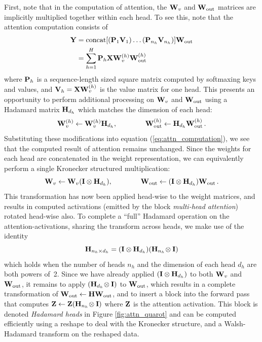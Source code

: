 First, note that in the computation of attention, the ${\mathbf{W}}_v$ and ${\mathbf{W}}_\textrm{out}$ matrices are implicitly multiplied together within each head. To see this, note that the attention computation consists of
\begin{align}
    {\mathbf{Y}} &= \textrm{concat}[({\mathbf{P}}_1{\mathbf{V}}_1)\ldots({\mathbf{P}}_{n_h} {\mathbf{V}}_{n_h})]{\mathbf{W}}_\textrm{out}\\
    &= \sum_{h=1}^H {\mathbf{P}}_h{\mathbf{X}}{\mathbf{W}}_v^{(h)} {\mathbf{W}}_\textrm{out}^{(h)}\label{eq:attn_computation}
\end{align}
where ${\mathbf{P}}_h$ is a sequence-length sized square matrix computed by softmaxing keys and values, and ${\mathbf{V}}_h = {\mathbf{X}}{\mathbf{W}}_v^{(h)}$ is the value matrix for one head.  This presents an opportunity to perform additional processing on ${\mathbf{W}}_v$ and ${\mathbf{W}}_\textrm{out}$ using a Hadamard matrix ${\mathbf{H}}_{d_h}$ which matches the dimension of each head:
\begin{equation}
    {\mathbf{W}}_v^{(h)} \leftarrow {\mathbf{W}}_v^{(h)}{\mathbf{H}}_{d_h},\qquad\qquad {\mathbf{W}}_\textrm{out}^{(h)} \leftarrow {\mathbf{H}}_{d_h}{\mathbf{W}}_\textrm{out}^{(h)}\,.
\end{equation}
Substituting these modifications into equation (\ref{eq:attn_computation}), we see that the computed result of attention remains unchanged. Since the weights for each head are concatenated in the weight representation, we can equivalently perform a single Kronecker structured multiplication:
\begin{equation}
    {\mathbf{W}}_v \leftarrow {\mathbf{W}}_v ( {\mathbf{I}} \otimes {\mathbf{H}}_{d_h}),\qquad \qquad {\mathbf{W}}_\textrm{out} \leftarrow ({\mathbf{I}} \otimes {\mathbf{H}}_{d_h}) {\mathbf{W}}_\textrm{out}\,.
\end{equation}
This transformation has now been applied head-wise to the weight matrices, and results in computed activations (emitted by the block \emph{multi-head attention}) rotated head-wise also. To complete a ``full'' Hadamard operation on the attention-activations, sharing the transform across heads, we make use of the identity
\begin{equation}
    {\mathbf{H}}_{n_h \times d_h} = ({\mathbf{I}} \otimes{\mathbf{H}}_{d_h}) ({\mathbf{H}}_{n_h}\!\otimes {\mathbf{I}})
\end{equation}
which holds when the number of heads $n_h$ and the dimension of each head $d_h$ are both powers of~2. Since we have already applied $({\mathbf{I}} \otimes{\mathbf{H}}_{d_h})$ to both ${\mathbf{W}}_v$ and ${\mathbf{W}}_\textrm{out}$, it remains to apply $({\mathbf{H}}_{d_h}\!\otimes {\mathbf{I}})$ to ${\mathbf{W}}_\textrm{out}$, which results in a complete transformation of ${\mathbf{W}}_\textrm{out}\leftarrow{\mathbf{H}}{\mathbf{W}}_\textrm{out}$, and to insert a block into the forward pass that computes ${\mathbf{Z}} \leftarrow {\mathbf{Z}} ({\mathbf{H}}_{n_h}\!\otimes {\mathbf{I}})$ where ${\mathbf{Z}}$ is the attention activation. This block is denoted \emph{Hadamard heads} in Figure \ref{fig:attn_quarot} and can be computed efficiently using a reshape to deal with the Kronecker structure, and a Walsh-Hadamard transform on the reshaped data.

